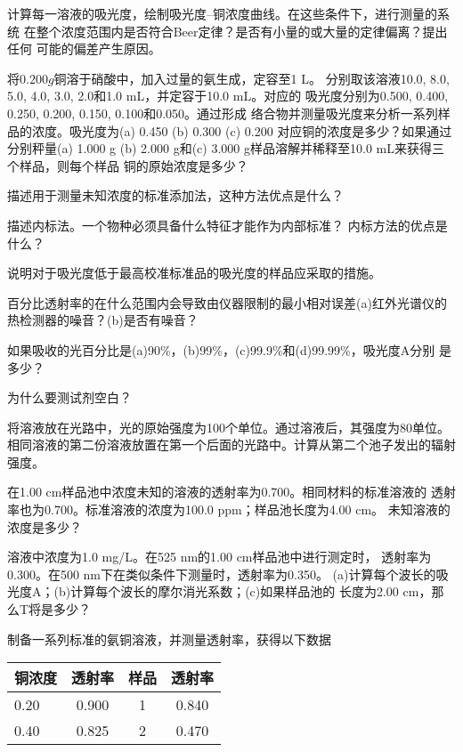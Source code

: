 \begin{problemset}
    计算每一溶液的吸光度，绘制吸光度--铜浓度曲线。在这些条件下，进行测量的系统
    在整个浓度范围内是否符合Beer定律？是否有小量的或大量的定律偏离？提出任何
    可能的偏差产生原因。
\item 将$0.200 g$铜溶于硝酸中，加入过量的氨生成，定容至1 L。
    分别取该溶液10.0, 8.0, 5.0, 4.0, 3.0, 2.0和1.0 mL，并定容于10.0 mL。对应的
    吸光度分别为0.500, 0.400, 0.250, 0.200, 0.150, 0.100和0.050。通过形成
    络合物并测量吸光度来分析一系列样品的浓度。吸光度为(a)
    0.450 (b) 0.300 (c) 0.200 对应铜的浓度是多少？如果通过分别秤量(a) 1.000 g
    (b) 2.000 g和(c) 3.000 g样品溶解并稀释至10.0 mL来获得三个样品，则每个样品
    铜的原始浓度是多少？
\item 描述用于测量未知浓度的标准添加法，这种方法优点是什么？
\item 描述内标法。一个物种必须具备什么特征才能作为内部标准？
    内标方法的优点是什么？
\item 说明对于吸光度低于最高校准标准品的吸光度的样品应采取的措施。
\item 百分比透射率的在什么范围内会导致由仪器限制的最小相对误差(a)红外光谱仪的
    热检测器的噪音？(b)是否有噪音？
\item 如果吸收的光百分比是(a)90\%，(b)99\%，(c)99.9\%和(d)99.99\%，吸光度A分别
    是多少？
\item 为什么要测试剂空白？
\item 将溶液放在光路中，光的原始强度为100个单位。通过溶液后，其强度为80单位。
 相同溶液的第二份溶液放置在第一个后面的光路中。计算从第二个池子发出的辐射强度。
\item 在1.00 cm样品池中浓度未知的溶液的透射率为0.700。相同材料的标准溶液的
    透射率也为0.700。标准溶液的浓度为100.0 ppm；样品池长度为4.00 cm。
    未知溶液的浓度是多少？
\item 溶液中浓度为1.0 mg/L。在525 nm的1.00 cm样品池中进行测定时，
    透射率为0.300。在500 nm下在类似条件下测量时，透射率为0.350。
    (a)计算每个波长的吸光度A；(b)计算每个波长的摩尔消光系数；(c)如果样品池的
    长度为2.00 cm，那么T将是多少？
\item 制备一系列标准的氨铜溶液，并测量透射率，获得以下数据
    \begin{table}[htbp]
        \centering
        \begin{tabular}{lccc}
            \hline
            铜浓度&透射率&样品&透射率\\
            \hline
            0.20 & 0.900 & 1 & 0.840 \\
            0.40 & 0.825 & 2 & 0.470 \\

\end{tabular}
\end{table}
\end{problemset}

